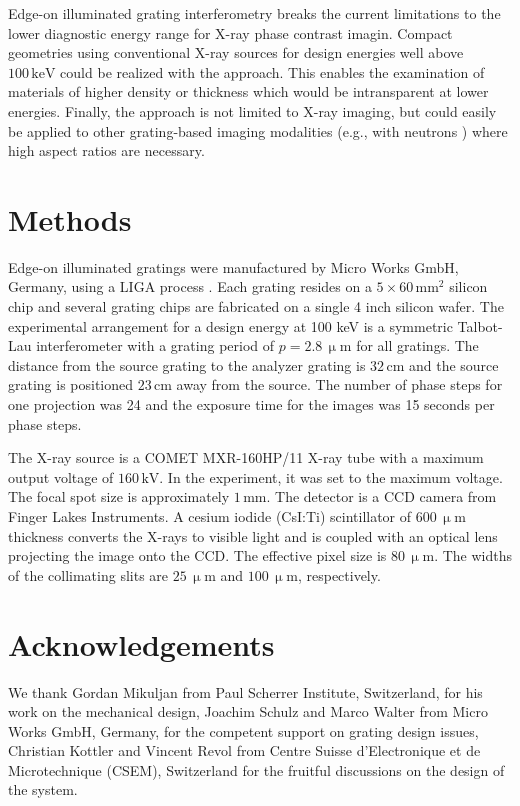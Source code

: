 \documentclass[aip,apl,amsmath,amssymb,floatfix,reprint,a4paper]{revtex4-1}
\newcommand{\unit}[1]{\ensuremath{\, \mathrm{#1}}}
\begin{document}
Edge-on illuminated grating interferometry breaks the current limitations to the lower diagnostic energy range for X-ray phase contrast imagin. Compact geometries  using conventional X-ray sources for design energies well above $100 \unit{keV}$ could be realized with the approach. This enables the examination of materials of higher density or thickness which would be intransparent at lower energies. Finally, the approach is not limited to X-ray imaging, but could easily be applied to other grating-based imaging modalities (e.g., with neutrons \cite{Grunzweig2008}) where high aspect ratios are necessary.

\section*{Methods}
Edge-on illuminated gratings were manufactured by Micro Works GmbH, Germany, using a LIGA process \cite{Kenntner2010}. Each grating resides on a $5 \times 60 \unit{mm^2}$ silicon chip and several grating chips are fabricated on a single 4 inch silicon wafer. The experimental arrangement for a design energy at 100 keV is a symmetric Talbot-Lau interferometer with a grating period of $p = 2.8 \unit{\upmu m}$ for all gratings. The distance from the source grating to the analyzer grating is $32 \unit{cm}$ and the source grating is positioned $23 \unit{cm}$ away from the source. The number of phase steps for one projection was 24 \cite{Weitkamp2005} and the exposure time for the images was 15 seconds per phase steps.

The X-ray source is a COMET MXR-160HP/11 X-ray tube with a maximum output voltage of $160 \unit{kV}$. In the experiment, it was set to the maximum voltage. The focal spot size is approximately $1 \unit{mm}$. The detector is a CCD camera from Finger Lakes Instruments. A cesium iodide (CsI:Ti) scintillator of $600 \unit{\upmu m}$ thickness converts the X-rays to visible light and is coupled with an optical lens projecting the image onto the CCD. The effective pixel size is $80 \unit{\upmu m}$. The widths of the collimating slits are $25 \unit{\upmu m}$ and $100 \unit{\upmu m}$, respectively.

\section*{Acknowledgements}
We thank Gordan Mikuljan from Paul Scherrer Institute, Switzerland, for his work on the mechanical design, Joachim Schulz and Marco Walter from Micro Works GmbH, Germany, for the competent support on grating design issues, Christian Kottler and Vincent Revol from Centre Suisse d'Electronique et de Microtechnique (CSEM), Switzerland for the fruitful discussions on the design of the system.





\end{document}
